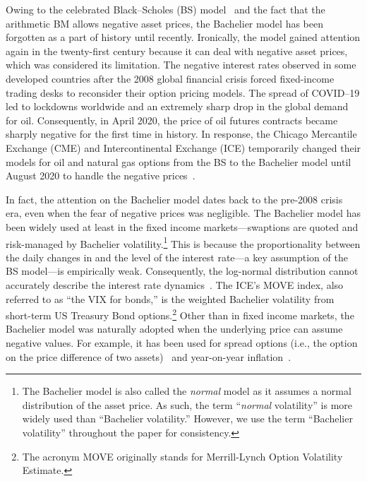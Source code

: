 \documentclass[a4paper,review]{elsarticle}
\begin{document}
Owing to the celebrated Black--Scholes (BS) model~\citep{blackscholes1973,merton1973theory} and the fact that the arithmetic BM allows negative asset prices, the Bachelier model has been forgotten as a part of history until recently. Ironically, the model gained attention again in the twenty-first century because it can deal with negative asset prices, which was considered its limitation. The negative interest rates observed in some developed countries
after the 2008 global financial crisis forced fixed-income trading desks to reconsider their option pricing models. The spread of COVID--19 led to lockdowns worldwide and an extremely sharp drop in the global demand for oil. Consequently, in April 2020, the price of oil futures contracts became sharply negative for the first time in history. In response, the Chicago Mercantile Exchange (CME) and Intercontinental Exchange (ICE) temporarily changed their models for oil and natural gas options from the BS to the Bachelier model until August 2020 to handle the negative prices~\citep{cme2020bachelier,cme2020naturalgas,cme2020transition,ice2020negative}.

In fact, the attention on the Bachelier model dates back to the pre-2008 crisis era, even when the fear of negative prices was negligible. The Bachelier model has been widely used at least in the fixed income markets---swaptions are quoted and risk-managed by Bachelier volatility.\footnote{The Bachelier model is also called the \textit{normal} model as it assumes a normal distribution of the asset price. As such, the term ``\textit{normal} volatility'' is more widely used than ``Bachelier volatility.'' However, we use the term ``Bachelier volatility'' throughout the paper for consistency.} This is because the proportionality between the daily changes in and the level of the interest rate---a key assumption of the BS model---is empirically weak. Consequently, the log-normal distribution cannot accurately describe the interest rate dynamics~\citep{levin2002interest,levin2004rate,ho2003interest}.
The ICE's MOVE index, also referred to as ``the VIX for bonds,'' is the weighted Bachelier volatility from short-term US Treasury Bond options.\footnote{The acronym MOVE originally stands for Merrill-Lynch Option Volatility Estimate.}
Other than in fixed income markets, the Bachelier model was naturally adopted when the underlying price can assume negative values. For example, it has been used for spread options (i.e., the option on the price difference of two assets)~\citep{poitras1998spread} and year-on-year inflation~\citep{kenyon2008inflation}.
\end{document}

